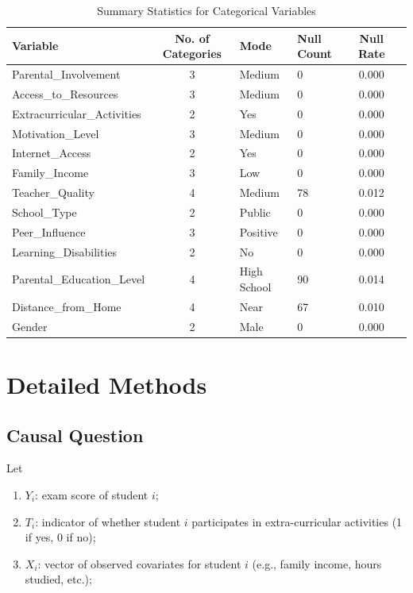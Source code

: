 \documentclass[11pt]{article}
\begin{document}
\begin{table}[H]
\centering
\caption{Summary Statistics for Categorical Variables}
\label{tab:categorical_summary}
\begin{tabularx}{\textwidth}{l c X l c c}
\toprule
Variable & No. of Categories  & Mode & Null Count & Null Rate \\
\midrule
Parental\_Involvement      & 3                     & Medium      & 0  & 0.000 \\
Access\_to\_Resources      & 3                   & Medium      & 0  & 0.000 \\
Extracurricular\_Activities& 2                            & Yes         & 0  & 0.000 \\
Motivation\_Level          & 3                    & Medium      & 0  & 0.000 \\
Internet\_Access           & 2                            & Yes         & 0  & 0.000 \\
Family\_Income             & 3                   & Low         & 0  & 0.000 \\
Teacher\_Quality           & 4                    & Medium      & 78 & 0.012 \\
School\_Type               & 2                      & Public      & 0  & 0.000 \\
Peer\_Influence            & 3          & Positive    & 0  & 0.000 \\
Learning\_Disabilities     & 2                             & No          & 0  & 0.000 \\
Parental\_Education\_Level & 4   & High School & 90 & 0.014 \\
Distance\_from\_Home       & 4                & Near        & 67 & 0.010 \\
Gender                     & 2                        & Male        & 0  & 0.000 \\
\bottomrule
\end{tabularx}
\end{table}

\section{Detailed Methods}

\subsection{Causal Question}

Let 
\begin{enumerate}
    \item $Y_i$: exam score of student $i$;
    \item $T_i$: indicator of whether student $i$ participates in extra-curricular activities (1 if yes, 0 if no);
    \item $X_i$: vector of observed covariates for student $i$ (e.g., family income, hours studied, etc.);
\end{enumerate}
\end{document}
